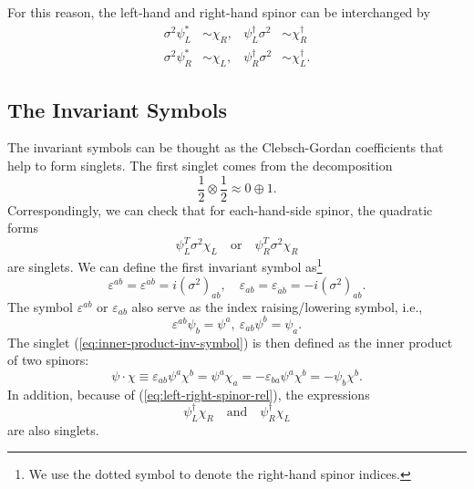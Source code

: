 For this reason, the left-hand and right-hand spinor can be interchanged by
\begin{equation}
\begin{aligned}
	\sigma^2 \psi_L^* &\sim \chi_R, & \psi_L^\dagger \sigma^2 &\sim \chi^\dagger_R \\
	\sigma^2 \psi_R^* &\sim \chi_L, & \psi^\dagger_R \sigma^2 &\sim \chi^\dagger_L.
	\label{eq:left-right-spinor-rel}
\end{aligned}
\end{equation}



\subsection{The Invariant Symbols}
The invariant symbols can be thought as the Clebsch-Gordan coefficients that help to form singlets.
The first singlet comes from the decomposition
\begin{equation*}
	\frac{1}{2}\otimes \frac{1}{2} \approx 0 \oplus 1.
\end{equation*}
Correspondingly, we can check that for each-hand-side spinor, the quadratic forms
\begin{equation}
	\psi_L^T\sigma^2\chi_L \quad \text{or} \quad 
	\psi_R^T\sigma^2\chi_R
	\label{eq:inner-product-inv-symbol}
\end{equation}
are singlets.
We can define the first invariant symbol as\footnote{We use the dotted symbol to denote the right-hand spinor indices.}
\begin{equation}
	\varepsilon^{ab} = \varepsilon^{\dot a \dot b} = i(\sigma^2)_{ab}, \quad
	\varepsilon_{ab} = \varepsilon_{\dot a \dot b} = -i(\sigma^2)_{ab}.
\end{equation}
The symbol $\varepsilon^{ab}$ or $\varepsilon_{ab}$ also serve as the index raising/lowering symbol, i.e.,
\begin{equation}
	\varepsilon^{ab}\psi_b = \psi^a,\ 
	\varepsilon_{ab}\psi^b = \psi_a.
\end{equation}
The singlet (\ref{eq:inner-product-inv-symbol}) is then defined as the inner product of two spinors:
\begin{equation}
	\psi\cdot\chi 
	\equiv \varepsilon_{ab}\psi^a\chi^b
	= \psi^a\chi_{a}
	= -\varepsilon_{ba}\psi^a\chi^b
	= -\psi_b\chi^b.
\end{equation}
In addition, because of (\ref{eq:left-right-spinor-rel}), the expressions
\begin{equation*}
	\psi_L^\dagger \chi_R \quad \text{and} \quad \psi_R^\dagger \chi_L
\end{equation*}
are also singlets.

